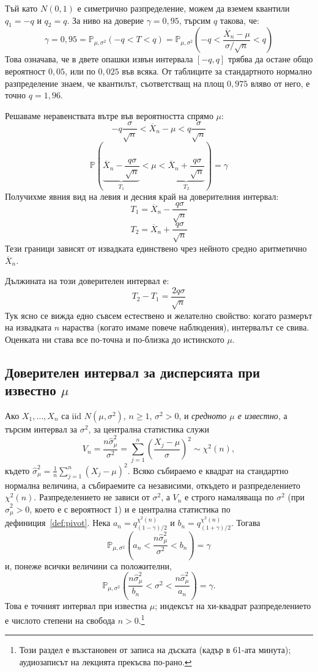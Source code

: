 Тъй като $N(0,1)$ е симетрично разпределение, можем да вземем квантили $q_1 = -q$ и $q_2 = q$. За ниво на доверие $\gamma = 0{,}95$, търсим $q$ такова, че:
\[
\gamma = 0{,}95 = \mathbb{P}_{\mu,\sigma^2}(-q < T < q) = \mathbb{P}_{\mu,\sigma^2}\left(-q < \frac{\overline{X}_n - \mu}{\sigma / \sqrt{n}} < q\right)
\]
Това означава, че в двете опашки извън интервала $[-q, q]$ трябва да остане общо вероятност $0{,}05$, или по $0{,}025$ във всяка. От таблиците за стандартното нормално разпределение знаем, че квантилът, съответстващ на площ $0{,}975$ вляво от него, е точно $q = 1{,}96$.

Решаваме неравенствата вътре във вероятността спрямо $\mu$:
\[
-q \frac{\sigma}{\sqrt{n}} < \overline{X}_n - \mu < q \frac{\sigma}{\sqrt{n}}
\]
\[
\mathbb{P}\left( \underbrace{\overline{X}_n - \frac{q\sigma}{\sqrt{n}}}_{T_1} < \mu < \underbrace{\overline{X}_n + \frac{q\sigma}{\sqrt{n}}}_{T_2} \right) = \gamma
\]
Получихме явния вид на левия и десния край на доверителния интервал:
\[
T_1 = \overline{X}_n - \frac{q\sigma}{\sqrt{n}}
\]
\[
T_2 = \overline{X}_n + \frac{q\sigma}{\sqrt{n}}
\]
Тези граници зависят от извадката единствено чрез нейното средно аритметично $\overline{X}_n$.

Дължината на този доверителен интервал е:
\[
T_2 - T_1 = \frac{2q\sigma}{\sqrt{n}}
\]
Тук ясно се вижда едно съвсем естествено и желателно свойство: когато размерът на извадката $n$ нараства (когато имаме повече наблюдения), интервалът се свива. Оценката ни става все по-точна и по-близка до истинското $\mu$.

\subsection{Доверителен интервал за дисперсията при известно $\mu$}

Ако $X_1,\dots,X_n$ са iid $N(\mu, \sigma^2)$, $n\ge 1$, $\sigma^2>0$, и
\emph{средното $\mu$ е известно}, а търсим интервал за
$\sigma^2$, за централна статистика служи
\[
V_n = \frac{n\hat{\sigma}^2_{\mu}}{\sigma^2}
    = \sum_{j=1}^{n} \left( \frac{X_j - \mu}{\sigma} \right)^{\!2}
    \sim \chi^2(n),
\]
където $\hat{\sigma}^2_{\mu} = \frac1n \sum_{j=1}^n (X_j - \mu)^2$. Всяко събираемо е квадрат
на стандартно нормална величина, а събираемите са независими, откъдето и разпределението
$\chi^2(n)$. Разпределението не зависи от $\sigma^2$, а $V_n$ е строго намаляваща по
$\sigma^2$ (при $\hat{\sigma}^2_{\mu}>0$, което е с вероятност $1$) и е централна
статистика по дефиниция~\ref{def:pivot}. Нека
$a_n=q_{(1-\gamma)/2}^{\chi^2(n)}$ и $b_n=q_{(1+\gamma)/2}^{\chi^2(n)}$. Тогава
\[
\mathbb{P}_{\mu,\sigma^2}\!\left(a_n<\frac{n\hat{\sigma}^2_{\mu}}{\sigma^2}<b_n\right)=\gamma
\]
и, понеже всички величини са положителни,
\[
\mathbb{P}_{\mu,\sigma^2}\!\left(
\frac{n\hat{\sigma}^2_{\mu}}{b_n}<\sigma^2<\frac{n\hat{\sigma}^2_{\mu}}{a_n}
\right)=\gamma.
\]
Това е точният интервал при известна $\mu$; индексът на хи-квадрат разпределението е
числото степени на свобода $n>0$.\footnote{Този раздел е възстановен от записа на
дъската (кадър в 61-ата минута); аудиозаписът на лекцията прекъсва по-рано.}

